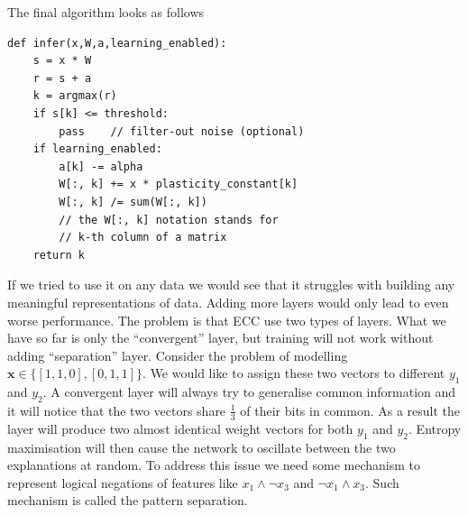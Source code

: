 \documentclass[12pt]{article}
\begin{document}
The final algorithm looks as follows
\begin{lstlisting}
def infer(x,W,a,learning_enabled):
    s = x * W
    r = s + a
    k = argmax(r)
    if s[k] <= threshold:
        pass    // filter-out noise (optional)
    if learning_enabled:
        a[k] -= alpha
        W[:, k] += x * plasticity_constant[k]
        W[:, k] /= sum(W[:, k])
        // the W[:, k] notation stands for 
        // k-th column of a matrix
    return k
\end{lstlisting}

\iffalse
If we tried to use it on any data we would see that it struggles with building  any meaningful representations of data. Adding more layers would only lead to even worse performance. The problem is that ECC use two types of layers. What we have so far is only the ``convergent'' layer, but training will not work without adding ``separation'' layer. Consider the problem of modelling $\boldsymbol{x}\in\{[1,1,0],[0,1,1]\}$. We would like to assign these two vectors to different $y_1$ and $y_2$. A convergent layer will always try to generalise common information and it will notice that the two vectors share $\frac{1}{3}$ of their bits in common. As a result the layer will produce two almost identical weight vectors for both $y_1$ and $y_2$. Entropy maximisation will then cause the network to oscillate between the two explanations at random. To address this issue we need some mechanism to represent logical negations of features like $x_1\wedge \neg x_3$ and $\neg x_1\wedge x_3$. Such mechanism is called the pattern separation. 
\end{document}

